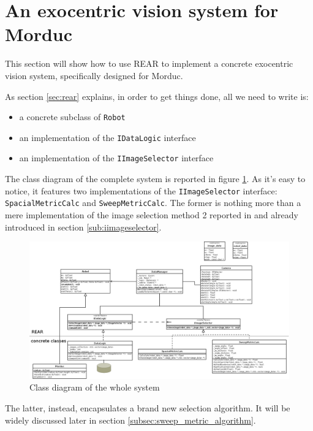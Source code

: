 \section{An exocentric vision system for Morduc}
\label{sec:concr}
This section will show how to use \textsf{REAR} to implement a 
concrete exocentric vision system, specifically designed for 
Morduc.
%

%
As section \ref{sec:rear} explains, in order to get things 
done, all we need to write is:
\begin{itemize}
\item a concrete subclass of \texttt{Robot}
\item an implementation of the \texttt{IDataLogic} interface
\item an implementation of the \texttt{IImageSelector} interface
\end{itemize}
%
The class diagram of the complete system is reported in figure 
\ref{fig:class_diagram_complete}. 
%
As it's easy to notice, it features two implementations 
of the \texttt{IImageSelector} interface: \texttt{SpacialMetricCalc} 
and \texttt{SweepMetricCalc}. The former is nothing more than 
a mere implementation of the image selection method 2 reported in 
\cite{sugimoto} and already introduced in section \ref{sub:iimageselector}.
%

%
\begin{figure}[!h]
  \begin{center}
    \includegraphics[width=400pt]{img/class_diagram.png} 
    \caption{Class diagram of the whole system}
    \label{fig:class_diagram_complete}
  \end{center}
\end{figure}
%

The latter, instead, encapsulates a brand new selection algorithm. 
It will be widely discussed later in section 
\ref{subsec:sweep_metric_algorithm}.


